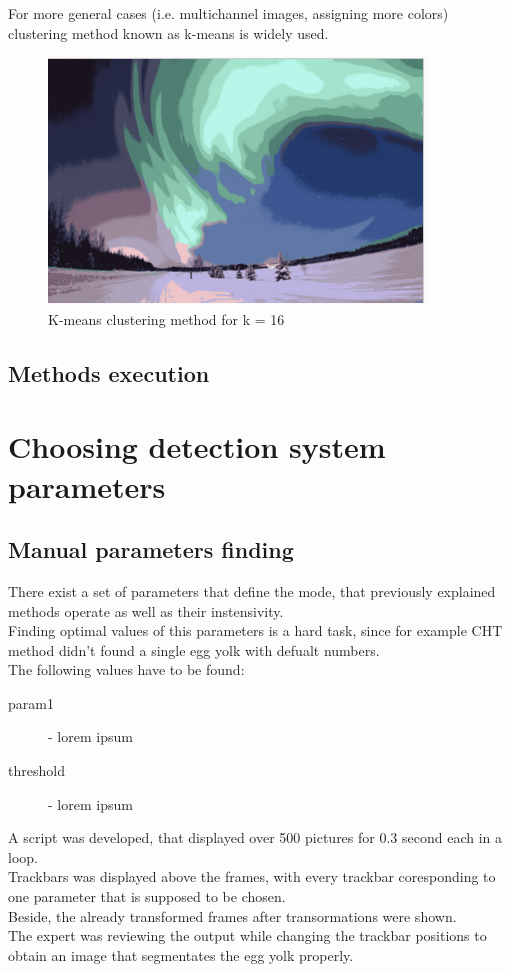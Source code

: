\documentclass[12pt,twoside,a4paper]{article}
\begin{document}
For more general cases (i.e. multichannel images, assigning more colors) clustering method known as k-means is widely used.\cite{lesscv}
 
\begin{figure}[H]
\centering
\includegraphics[width=0.4\paperwidth]{kmeans}
\caption{K-means clustering method for k = 16\cite{segm}}
\end{figure}
\subsection{Methods execution}


\section{Choosing detection system parameters}
\subsection{Manual parameters finding}

There exist a set of parameters that define the mode, that previously explained methods operate as well as their instensivity.\\
Finding optimal values of this parameters is a hard task, since for example CHT method didn't found a single egg yolk with defualt numbers.\\
The following values have to be found:
\begin{description}
\item[param1] - lorem ipsum
\item[threshold] - lorem ipsum
\end{description}

A script was developed, that displayed over 500 pictures for 0.3 second each in a loop.\\
Trackbars was displayed above the frames, with every trackbar coresponding to one parameter that is supposed to be chosen.\\
Beside, the already transformed frames after transormations were shown.\\
The expert was reviewing the output while changing the trackbar positions to obtain an image that segmentates the egg yolk properly.\\
\end{document}
